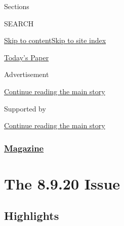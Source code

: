 Sections

SEARCH

\protect\hyperlink{site-content}{Skip to
content}\protect\hyperlink{site-index}{Skip to site index}

\href{https://myaccount.nytimes.com/auth/login?response_type=cookie\&client_id=vi}{}

\href{https://www.nytimes.com/section/todayspaper}{Today's Paper}

Advertisement

\protect\hyperlink{after-top}{Continue reading the main story}

Supported by

\protect\hyperlink{after-sponsor}{Continue reading the main story}

\hypertarget{magazine}{%
\subsubsection{\texorpdfstring{\href{/section/magazine}{Magazine}}{Magazine}}\label{magazine}}

\hypertarget{the-8920-issue}{%
\section{The 8.9.20 Issue}\label{the-8920-issue}}

\hypertarget{highlights}{%
\subsection{Highlights}\label{highlights}}

